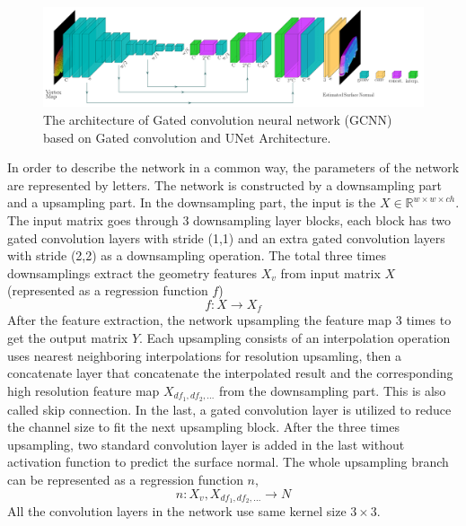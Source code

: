 \documentclass[border=15pt, multi, tikz]{article}
\begin{document}
\begin{figure}
	\centering
	\includegraphics[width=1\textwidth]{Figures/gcnn}
	\caption{The architecture of Gated convolution neural network (GCNN) based on Gated convolution and UNet Architecture.}
	\label{fig:gcnn-archi}
\end{figure}
In order to describe the network in a common way, the parameters of the network are represented by letters.
The network is constructed by a downsampling part and a upsampling part. In the downsampling part, the input is the $ X \in \mathbb{R}^{w\times w\times ch}$. The input matrix goes through 3 downsampling layer blocks, each block has two gated convolution layers with stride (1,1) and an extra gated convolution layers with stride (2,2) as a downsampling operation. 
The total three times downsamplings extract the geometry features $ X_v $ from input matrix $ X $ (represented as a regression function $ f $)
\[ f: X \rightarrow X_f \]
After the feature extraction, the network upsampling the feature map 3 times to get the output matrix $ Y $. Each upsampling consists of an interpolation operation uses nearest neighboring interpolations for resolution upsamling, then a concatenate layer that concatenate the interpolated result and the corresponding high resolution feature map  $ X_{df_1, df_2, ...} $  from the downsampling part. This is also called skip connection. In the last, a gated convolution layer is utilized to reduce the channel size to fit the next upsampling block. After the three times upsampling, two standard convolution layer is added in the last without activation function to predict the surface normal. The whole upsampling branch can be represented as a regression function $ n $,
\[ n: X_v, X_{df_1, df_2, ...} \rightarrow N \]
All the convolution layers in the network use same kernel size $ 3\times 3 $. 
\end{document}
